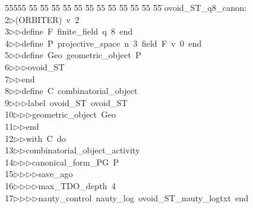 %
%
\begin{tabbing}
55555 \= 55 \= 55 \= 55 \= 55 \= 55 \= 55 \= 55 \= 55 \= 55 \= 55 \= 55 \= 55 \= \>ovoid\_ST\_q8\_canon:\ \\[0pt]
2\>$\triangleright$\>(ORBITER)\ v\ 2\ \\[0pt]
3\>$\triangleright$\>$\triangleright$\>define\ F\ finite\_field\ q\ 8\ end\ \\[0pt]
4\>$\triangleright$\>$\triangleright$\>define\ P\ projective\_space\ n\ 3\ field\ F\ v\ 0\ end\ \\[0pt]
5\>$\triangleright$\>$\triangleright$\>define\ Geo\ geometric\_object\ P\ \\[0pt]
6\>$\triangleright$\>$\triangleright$\>$\triangleright$\>ovoid\_ST\ \\[0pt]
7\>$\triangleright$\>$\triangleright$\>end\ \\[0pt]
8\>$\triangleright$\>$\triangleright$\>define\ C\ combinatorial\_object\ \\[0pt]
9\>$\triangleright$\>$\triangleright$\>$\triangleright$\>label\ ovoid\_ST\ ovoid\_ST\ \\[0pt]
10\>$\triangleright$\>$\triangleright$\>$\triangleright$\>geometric\_object\ Geo\ \\[0pt]
11\>$\triangleright$\>$\triangleright$\>end\ \\[0pt]
12\>$\triangleright$\>$\triangleright$\>with\ C\ do\ \\[0pt]
13\>$\triangleright$\>$\triangleright$\>combinatorial\_object\_activity\ \\[0pt]
14\>$\triangleright$\>$\triangleright$\>$\triangleright$\>canonical\_form\_PG\ P\ \\[0pt]
15\>$\triangleright$\>$\triangleright$\>$\triangleright$\>$\triangleright$\>save\_ago\ \\[0pt]
16\>$\triangleright$\>$\triangleright$\>$\triangleright$\>$\triangleright$\>max\_TDO\_depth\ 4\ \\[0pt]
17\>$\triangleright$\>$\triangleright$\>$\triangleright$\>$\triangleright$\>nauty\_control\ nauty\_log\ ovoid\_ST\_nauty\_logtxt\ end\ \\[0pt]

\end{tabbing}
